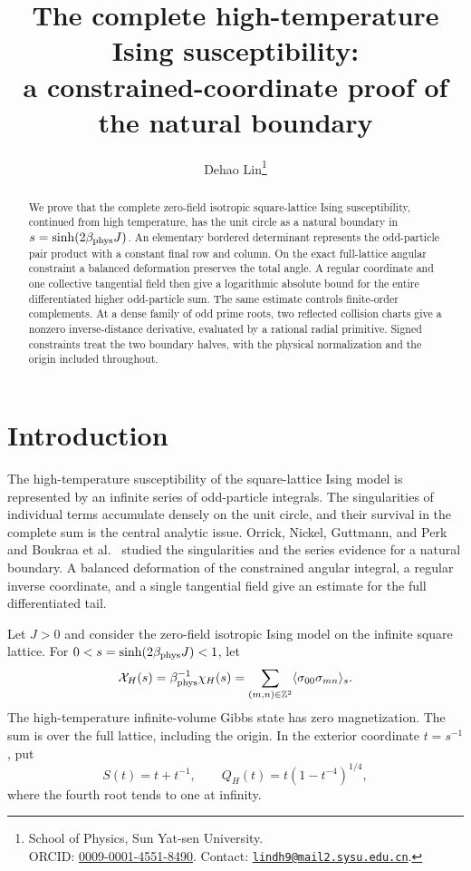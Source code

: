 \documentclass[11pt]{article}
\title{The complete high-temperature Ising susceptibility:\\ a constrained-coordinate proof of the natural boundary}
\author{Dehao Lin\thanks{\raggedright School of Physics, Sun Yat-sen University.\\ORCID: \href{https://orcid.org/0009-0001-4551-8490}{0009-0001-4551-8490}. Contact: \href{mailto:lindh9@mail2.sysu.edu.cn}{\texttt{lindh9@mail2.sysu.edu.cn}}.}}
\date{}
\numberwithin{equation}{section}
\theoremstyle{remark}\newtheorem{remark}[theorem]{Remark}
\newcommand{\X}{\mathcal X_H}
\begin{document}
\maketitle
\begin{abstract}
We prove that the complete zero-field isotropic square-lattice Ising
susceptibility, continued from high temperature, has the unit circle
as a natural boundary in $s=\sinh(2\beta_{\rm phys}J)$.
An elementary bordered determinant represents the odd-particle
pair product with a constant final row and column. On the exact
full-lattice angular constraint a balanced deformation preserves the
total angle. A regular coordinate and one collective tangential field
then give a logarithmic absolute bound for the entire differentiated
higher odd-particle sum. The same estimate controls finite-order
complements. At a dense family of odd prime roots, two reflected
collision charts give a nonzero inverse-distance derivative, evaluated
by a rational radial primitive. Signed constraints treat the two
boundary halves, with the physical normalization and the origin
included throughout.
\end{abstract}

\section{Introduction}
The high-temperature susceptibility of the square-lattice Ising model
is represented by an infinite series of odd-particle integrals. The
singularities of individual terms accumulate densely on the unit circle,
and their survival in the complete sum is the central analytic issue.
Orrick, Nickel, Guttmann, and Perk \cite[Section~3.2]{Orrick} and
Boukraa et al.\ \cite{Boukraa} studied the singularities and the series
evidence for a natural boundary. A balanced deformation of the
constrained angular integral, a regular inverse coordinate, and a
single tangential field give an estimate for the full differentiated
tail.

Let $J>0$ and consider the zero-field isotropic Ising model on the
infinite square lattice. For $0<s=\sinh(2\beta_{\rm phys}J)<1$,
let
\[
 \X(s)=\beta_{\rm phys}^{-1}\chi_H(s)
       =\sum_{(m,n)\in\mathbb Z^2}\langle\sigma_{00}\sigma_{mn}\rangle_s.
\]
The high-temperature infinite-volume Gibbs state has zero
magnetization. The sum is over the full lattice, including the origin.
In the exterior coordinate $t=s^{-1}$, put
\[
 S(t)=t+t^{-1},\qquad Q_H(t)=t(1-t^{-4})^{1/4},
\]
where the fourth root tends to one at infinity.
\end{document}
